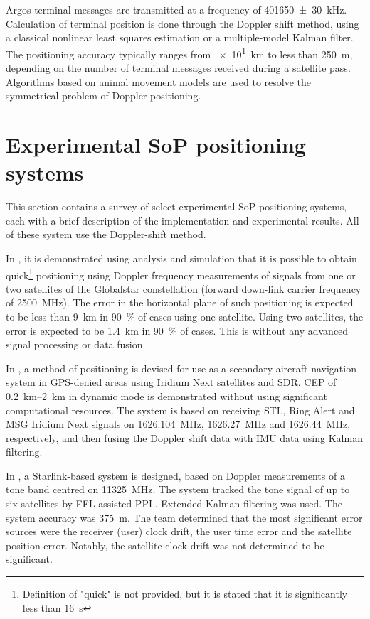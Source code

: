 Argos terminal messages are transmitted at a frequency of \qty{401650(30)}{kHz}. Calculation of terminal position is done through the Doppler shift method, using a classical nonlinear least squares estimation or a multiple-model Kalman filter. The positioning accuracy typically ranges from \qty{e1}{km} to less than \qty{250}{m}, depending on the number of terminal messages received during a satellite pass\cite{sop09}. Algorithms based on animal movement models are used to resolve the symmetrical problem of Doppler positioning\cite{sat17}.



\section{Experimental SoP positioning systems}
This section contains a survey of select experimental SoP positioning systems, each with a brief description of the implementation and experimental results. All of these system use the Doppler-shift method.

In \cite{sop07}, it is demonstrated using analysis and simulation that it is possible to obtain quick\footnote{Definition of "quick" is not provided, but it is stated that it is significantly less than \qty{16}{\s}} positioning using Doppler frequency measurements of signals from one or two satellites of the Globalstar constellation (forward down-link carrier frequency of \qty{2500}{\mega\hertz}). The error in the horizontal plane of such positioning is expected to be less than \qty{9}{\km} in \qty{90}{\percent} of cases using one satellite. Using two satellites, the error is expected to be \qty{1.4}{\km} in \qty{90}{\percent} of cases. This is without any advanced signal processing or data fusion.

In \cite{sop01}, a method of positioning is devised for use as a secondary aircraft navigation system in GPS-denied areas using Iridium Next satellites and SDR. CEP of \qtyrange{0.2}{2}{\km} in dynamic mode is demonstrated without using significant computational resources. The system is based on receiving STL, Ring Alert and MSG Iridium Next signals on \qty{1626.104}{\mega\hertz}, \qty{1626.27}{\mega\hertz} and \qty{1626.44}{\mega\hertz}, respectively, and then fusing the Doppler shift data with IMU data using Kalman filtering.

In \cite{sop04}, a Starlink-based system is designed, based on Doppler measurements of a tone band centred on \qty{11 325}{\mega\hertz}. The system tracked the tone signal of up to six satellites by FFL-assisted-PPL. Extended Kalman filtering was used. The system accuracy was \qty{375}{\metre}. The team determined that the most significant error sources were the receiver (user) clock drift, the user time error and the satellite position error. Notably, the satellite clock drift was not determined to be significant.

